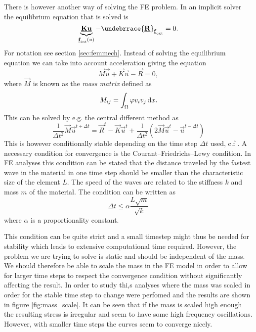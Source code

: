 \documentclass[grain_boundary_law.tex]{subfiles}
\begin{document}
There is however another way of solving the FE problem. In an implicit solver the equilibrium equation that is solved is
\begin{equation}
  \underbrace{\vec{K} \vec{u}}_{\vec{f}_\text{int}(u)} - \undebrrace{\vec{R}} _{\vec{f}_\text{ext}} = 0.
\end{equation}
%
For notation see section \ref{sec:femmech}. Instead of solving the equilibrium equation we can take into account acceleration giving the equation
%
\begin{equation}
 \vec{M}\vec{\ddot{u}} + \vec{K} \vec{u} - \vec{R} = 0,
\end{equation}
%
where $\vec{M}$ is known as the  \textit{mass matrix} defined as
%
\begin{equation}
M_{ij} = \int_\Omega \varphi v_i v_j \, \mathrm{d} x.
\end{equation}
%
This can be solved by e.g. the central different method as
%
\begin{equation}
\frac{1}{\Delta t^2} \vec{M} \vec{u}^{t + \Delta t} = \vec{R}^t - \vec{K} \vec{u}^t + \frac{1}{\Delta t^2} \left(2 \vec{M} \vec{u}^{t} - \vec{u}^{t-\Delta t} \right)
\end{equation}
This is however conditionally stable depending on the time step $\Delta t$ used, c.f \cite{Park1977343}. A necessary condition for convergence is the  Courant–Friedrichs–Lewy condition. In FE analyses this condition can be stated that the distance traveled by the fastest wave in the material in one time step should be smaller than the characteristic size of the element $L$. The speed of the waves are related to the stiffness $k$ and mass $m$ of the material. The condition can be written as
\begin{equation}
\Delta t \leq \alpha \frac{L \sqrt{m}}{\sqrt{k}}
\end{equation}
where $\alpha$ is a proportionality constant.

This condition can be quite strict and a small timestep might thus be needed for stability which leads to extensive computational time required. However, the problem we are trying to solve is static and should be independent of the mass. We should therefore be able to scale the mass in the FE model in order to allow for larger time steps to respect the convergence condition without significantly affecting the result. In order to study thi,s analyses where the mass was scaled in order for the stable time step to change were perfomed and the results are shown in figure \ref{fig:mass_scale}. It can be seen that if the mass is scaled high enough the resulting stress is irregular and seem to have some high frequency oscillations. However, with smaller time steps the curves seem to converge nicely. 
\end{document}
